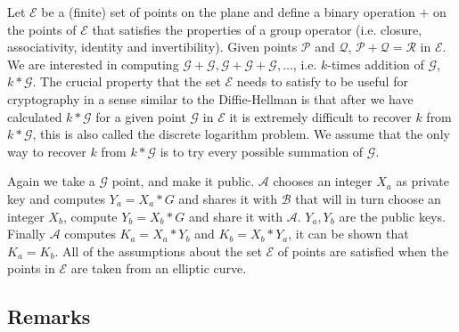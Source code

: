 Let $\mathcal{E}$ be a (finite) set of points on the plane and define a binary operation $+$ on the points of $\mathcal{E}$ that satisfies the properties of a group operator (i.e. closure, associativity, identity and invertibility). Given points $\mathcal{P}$ and $\mathcal{Q}$, $\mathcal{P}+\mathcal{Q} = \mathcal{R}$ in $\mathcal{E}$. We are interested in computing $\mathcal{G}+\mathcal{G}, \mathcal{G}+\mathcal{G}+\mathcal{G},\ldots$, i.e. $k$-times addition of $\mathcal{G}$, $k * \mathcal{G}$. The crucial property that the set $\mathcal{E}$ needs to satisfy to be useful for cryptography in a sense similar to the Diffie-Hellman is that after we have calculated $k * \mathcal{G}$ for a given point $\mathcal{G}$ in $\mathcal{E}$ it is extremely difficult to recover $k$ from $k * \mathcal{G}$, this is also called the discrete logarithm problem. We assume that the only way to recover $k$ from $k * \mathcal{G}$ is to try every possible summation of $\mathcal{G}$.

Again we take a $\mathcal{G}$ point, and make it public. $\mathcal{A}$ chooses an integer $X_a$ as private key and computes $Y_a = X_a * G$ and shares it with $\mathcal{B}$ that will in turn choose an integer $X_b$, compute $Y_b = X_b * G$ and share it with $\mathcal{A}$. $Y_a, Y_b$ are the public keys. Finally $\mathcal{A}$ computes $K_a = X_a * Y_b$ and $K_b = X_b * Y_a$, it can be shown that $K_a = K_b$.
All of the assumptions about the set $\mathcal{E}$ of points are satisfied when the points in $\mathcal{E}$ are taken from an elliptic curve.

\subsection{Remarks}

